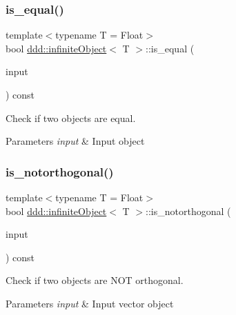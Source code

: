 \subsubsection{\texorpdfstring{is\+\_\+equal()}{is\_equal()}}
{\footnotesize\ttfamily template$<$typename T = Float$>$ \\
bool \hyperlink{classddd_1_1infinite_object}{ddd\+::infinite\+Object}$<$ T $>$\+::is\+\_\+equal (\begin{DoxyParamCaption}\item[{const \hyperlink{classddd_1_1infinite_object}{infinite\+Object}$<$ T $>$ \&}]{input }\end{DoxyParamCaption}) const\hspace{0.3cm}{\ttfamily [inline]}}



Check if two objects are equal. 


\begin{DoxyParams}{Parameters}
{\em input} & Input object \\
\hline
\end{DoxyParams}
\mbox{\label{classddd_1_1infinite_object_a1dbf3e37dc6f146f089c4c63c4704329}} 
\subsubsection{\texorpdfstring{is\+\_\+notorthogonal()}{is\_notorthogonal()}}
{\footnotesize\ttfamily template$<$typename T = Float$>$ \\
bool \hyperlink{classddd_1_1infinite_object}{ddd\+::infinite\+Object}$<$ T $>$\+::is\+\_\+notorthogonal (\begin{DoxyParamCaption}\item[{const \hyperlink{classddd_1_1infinite_object}{infinite\+Object}$<$ T $>$ \&}]{input }\end{DoxyParamCaption}) const\hspace{0.3cm}{\ttfamily [inline]}}



Check if two objects are N\+OT orthogonal. 


\begin{DoxyParams}{Parameters}
{\em input} & Input vector object \\
\hline
\end{DoxyParams}
\mbox{\label{classddd_1_1infinite_object_ad4f312a6d767c5825632d8915a9f7dbc}} 
